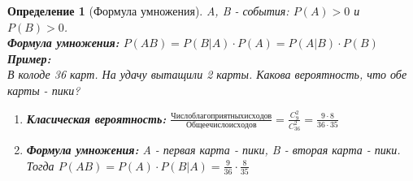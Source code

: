 \documentclass[14pt]{extarticle}
\theoremstyle{breakstyle}
\newtheorem{definition}{Определение}[subsection]
\begin{document}
\begin{definition}[Формула умножения]
A, B - события: $P(A) > 0$ и $P(B) > 0$. \\
\textbf{Формула умножения:} $P(AB) = P(B | A) \cdot P(A) = P(A | B) \cdot P(B)$ \\

\textbf{Пример:} \\
В колоде 36 карт. На удачу вытащили 2 карты. Какова вероятность, что обе карты - пики?\\

\begin{enumerate}[noitemsep, topsep=0pt]
    \item \textbf{Класическая вероятность:} $\frac{Число благоприятных исходов}{Общее число исходов} = \frac{C_{9}^{2}}{C_{36}^{2}} = \frac{9 \cdot 8}{36 \cdot 35}$
    \item \textbf{Формула умножения:} A - первая карта - пики, B - вторая карта - пики. Тогда $P(AB) = P(A) \cdot P(B | A) = \frac{9}{36} \cdot  \frac{8}{35}$
\end{enumerate}

\end{definition}
\end{document}
